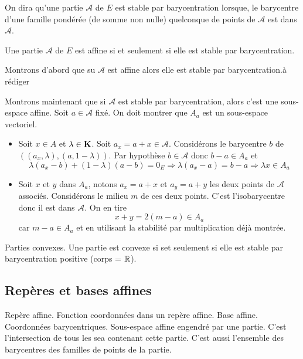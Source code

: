 \begin{defi}
 On dira qu'une partie $\mathcal A$ de $E$ est stable par barycentration lorsque, le barycentre d'une famille pondérée (de somme non nulle) quelconque de points de $\mathcal A$ est dans $\mathcal A$.
\end{defi}
\begin{prop}
 Une partie $\mathcal A$ de $E$ est affine si et seulement si elle est stable par barycentration.
\end{prop}
\begin{demo}
Montrons d'abord que su $\mathcal A$ est affine alors elle est stable par barycentration.\newline à rédiger

Montrons maintenant que si $\mathcal{A}$ est stable par barycentration, alors c'est une sous-espace affine.\newline
Soit $a\in \mathcal{A}$ fixé. On doit montrer que $A_a$ est un sous-espace vectoriel.
\begin{itemize}
 \item Soit $x\in A$ et $\lambda \in \mathbf{K}$. Soit $a_x=a+x\in \mathcal A$. Considérons le barycentre $b$ de $\left((a_x,\lambda), (a,1-\lambda) \right)$. Par hypothèse $b\in \mathcal A$ donc $b-a\in A_a$ et 
\begin{displaymath}
 \lambda(a_x-b)+(1-\lambda)(a-b)=0_E
\Rightarrow
\lambda(a_x -a) = b-a
\Rightarrow \lambda x \in A_a
\end{displaymath}
 \item Soit $x$ et $y$ dans $A_a$, notons $a_x=a+x$ et $a_y=a+y$ les deux points de $\mathcal A$ associés. Considérons le milieu $m$ de ces deux points. C'est l'isobarycentre donc il est dans $\mathcal A$. On en tire
\begin{displaymath}
 x+y = 2(m-a)\in A_a
\end{displaymath}
car $m-a\in A_a$ et en utilisant la stabilité par multiplication déjà montrée.
\end{itemize}

\end{demo}
Parties convexes. Une partie est convexe si set seulement si elle est stable par barycentration positive (corps = $\mathbb{R}$).
\subsection{Repères et bases affines}
Repère affine. Fonction coordonnées dans un repère affine. Base affine. Coordonnées barycentriques. Sous-espace affine engendré par une partie. C'est l'intersection de tous les sea contenant cette partie. C'est aussi l'ensemble des barycentres des familles de points de la partie.

